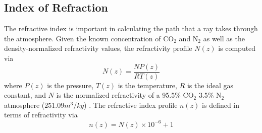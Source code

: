 \subsection{Index of Refraction}
The refractive index is important in calculating the path that a ray takes through the atmosphere. Given the known concentration of CO$_2$ and N$_2$ as well as the density-normalized refractivity values, the refractivity profile $N(z)$ is computed via
\begin{equation}
N(z) = \frac{NP(z)}{RT(z)}
\end{equation}
where $P(z)$ is the pressure, $T(z)$ is the temperature, $R$ is the ideal gas constant, and $N$ is the normalized refractivity of a 95.5\% CO$_2$ 3.5\% N$_2$ atmosphere ($251.09 m^3/kg$) \cite{Essen-1951}. The refractive index profile $n(z)$ is defined in terms of refractivity via
\begin{equation}
n(z) =  N(z) \times 10^{-6} +1
\end{equation}